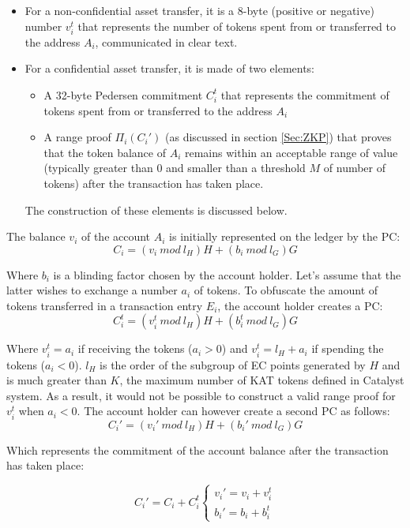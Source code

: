 \begin{itemize}
\item For a non-confidential asset transfer, it is a 8-byte (positive or negative) number $v^t_i$ that represents the number of tokens spent from or transferred to the address $A_i$, communicated in clear text.
\item For a confidential asset transfer, it is made of two elements: 
\begin{itemize}
\item A 32-byte Pedersen commitment $C_{i}^{t}$ that represents the commitment of tokens spent from or transferred to the address $A_i$ 
\item A range proof $\Pi_i(C_{i}')$ (as discussed in section \ref{Sec:ZKP}) that proves that the token balance of $A_i$ remains within an acceptable range of value (typically greater than 0 and smaller than a threshold $M$ of number of tokens) after the transaction has taken place.
\end{itemize}
 The construction of these elements is discussed below. 
\end{itemize}

The balance $v_i$ of the account $A_i$ is initially represented on the ledger by the PC: 
\begin{equation}
C_{i}=(v_i~mod~l_H)H+ (b_i~mod~l_G)G
\end{equation}

Where $b_i$ is a blinding factor chosen by the account holder. Let's assume that the latter wishes to exchange a number $a_i$ of tokens. To obfuscate the amount of tokens transferred in a transaction entry $E_i$, the account holder creates a PC: 
\begin{equation}
C_i^{t} = (v_i^{t}~mod~l_H)H+ (b_i^{t}~mod~l_G)G
\end{equation}

Where $v_i^{t} = a_i$ if receiving the tokens ($a_i > 0$) and $v_i^{t} = l_H+a_i$ if spending the tokens ($a_i<0$). $l_H$ is the order of the subgroup of EC points generated by $H$ and is much greater than $K$, the maximum number of KAT tokens defined in Catalyst system. As a result, it would not be possible to construct a valid range proof for $v_i^{t}$ when $a_i<0$. The account holder can however create a second PC as follows:
\begin{equation} 
C_{i}'=(v_i'~mod~l_H)H+ (b_i'~mod~l_G)G
\end{equation}

Which represents the commitment of the account balance after the transaction has taken place:
\begin{center}
\[
C_{i}' = C_i + C_i^{t}\begin{cases}
               v_i' = v_i + v_i^t\\
               b_i' = b_i + b_i^t
            \end{cases}
\]
\end{center}

